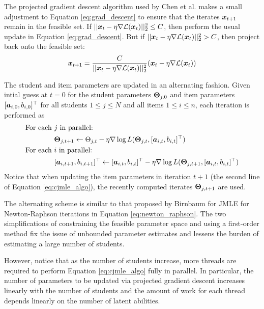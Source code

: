 The projected gradient descent algorithm used by Chen et al. makes a small adjustment to Equation \ref{eq:grad_descent} to ensure that the iterates $\boldsymbol{x}_{t+1}$ remain in the feasible set. If $||\boldsymbol{x}_t - \eta \nabla \mathcal{L}(\boldsymbol{x}_t)||_2^2 \leq C$, then perform the usual update in Equation \ref{eq:grad_descent}. But if $||\boldsymbol{x}_t - \eta \nabla \mathcal{L}(\boldsymbol{x}_t)||_2^2 > C$, then project back onto the feasible set:
\begin{equation}
  \boldsymbol{x}_{t+1} = \frac{C}{||\boldsymbol{x}_t - \eta \nabla \mathcal{L}(\boldsymbol{x}_t)||_2^2} (\boldsymbol{x}_t - \eta \nabla \mathcal{L}(\boldsymbol{x}_t))
  \label{eq:proj_grad_descent}
\end{equation}

The student and item parameters are updated in an alternating fashion. Given intial guess at $t=0$ for the student parameters $\boldsymbol{\Theta}_{j,0}$ and item parameters $[\boldsymbol{a}_{i,0}, b_{i,0}]^\top$ for all students $1\leq j \leq N$ and all items $1\leq i \leq n$, each iteration is performed as
\begin{equation}
\begin{split}
  \text{For each } &j \text{ in parallel:} \\
  &\boldsymbol{\Theta}_{j,t+1} \gets \Theta_{j,t} - \eta \nabla \log L(\boldsymbol{\Theta}_{j,t}, [\boldsymbol{a}_{i,t}, b_{i,t}]^\top) \\
  \text{For each } &i \text{ in parallel:} \\
  &[\boldsymbol{a}_{i,t+1}, b_{i,t+1}]^\top \gets [\boldsymbol{a}_{i,t}, b_{i,t}]^\top - \eta \nabla \log L(\boldsymbol{\Theta}_{j,t+1}, [\boldsymbol{a}_{i,t}, b_{i,t}]^\top)
\end{split}
  \label{eq:cjmle_algo}
\end{equation}
Notice that when updating the item parameters in iteration $t+1$ (the second line of Equation \ref{eq:cjmle_algo}), the recently computed iterates $\boldsymbol{\Theta}_{j,t+1}$ are used.

The alternating scheme is similar to that proposed by Birnbaum \cite{birnbaum1968} for JMLE for Newton-Raphson iterations in Equation \ref{eq:newton_raphson}. The two simplifications of constraining the feasible parameter space and using a first-order method fix the issue of unbounded parameter estimates and lessens the burden of estimating a large number of students.

However, notice that as the number of students increase, more threads are required to perform Equation \ref{eq:cjmle_algo} fully in parallel. In particular, the number of parameters to be updated via projected gradient descent increases linearly with the number of students and the amount of work for each thread depends linearly on the number of latent abilities.

